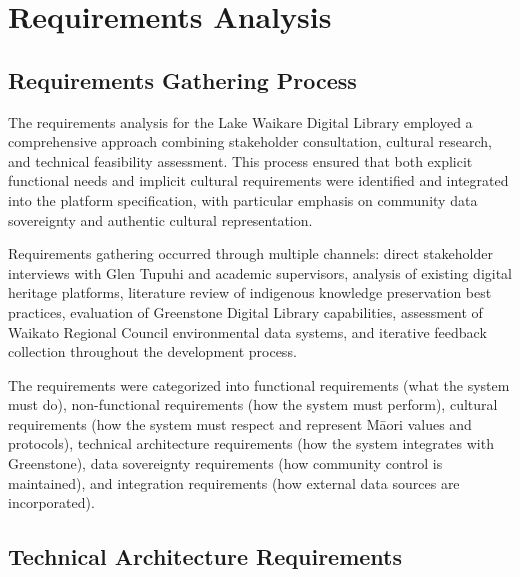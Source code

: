 ﻿%


\section{Requirements Analysis}
\label{sec:requirements}

\subsection{Requirements Gathering Process}
\label{subsec:requirements_process}

The requirements analysis for the Lake Waikare Digital Library employed a comprehensive approach combining stakeholder consultation, cultural research, and technical feasibility assessment. This process ensured that both explicit functional needs and implicit cultural requirements were identified and integrated into the platform specification, with particular emphasis on community data sovereignty and authentic cultural representation.

Requirements gathering occurred through multiple channels: direct stakeholder interviews with Glen Tupuhi and academic supervisors, analysis of existing digital heritage platforms, literature review of indigenous knowledge preservation best practices, evaluation of Greenstone Digital Library capabilities, assessment of Waikato Regional Council environmental data systems, and iterative feedback collection throughout the development process.

The requirements were categorized into functional requirements (what the system must do), non-functional requirements (how the system must perform), cultural requirements (how the system must respect and represent M\=aori values and protocols), technical architecture requirements (how the system integrates with Greenstone), data sovereignty requirements (how community control is maintained), and integration requirements (how external data sources are incorporated).

\subsection{Technical Architecture Requirements}
\label{subsec:technical_architecture}

